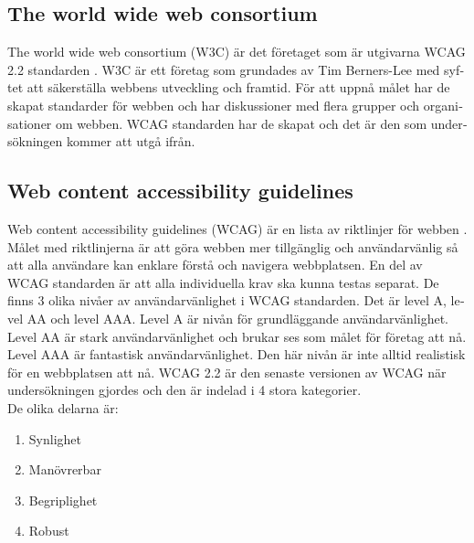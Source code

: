 \documentclass[11p]{article}
\begin{document}
\begin{otherlanguage}{swedish}
    \subsection{The world wide web consortium}
    The world wide web consortium (W3C) är det företaget som är utgivarna WCAG 2.2 standarden \parencite{W3C}.
    W3C är ett företag som grundades av Tim Berners-Lee med syftet att säkerställa webbens utveckling och framtid.
    För att uppnå målet har de skapat standarder för webben och har diskussioner med flera grupper och organisationer om webben.
    WCAG standarden har de skapat och det är den som undersökningen kommer att utgå ifrån.

    \subsection{Web content accessibility guidelines} %
    Web content accessibility guidelines (WCAG) är en lista av riktlinjer för webben \parencite{WCAG_2.2}.
    Målet med riktlinjerna är att göra webben mer tillgänglig och användarvänlig så att alla användare kan enklare förstå och navigera webbplatsen.
    En del av WCAG standarden är att alla individuella krav ska kunna testas separat.
    De finns 3 olika nivåer av användarvänlighet i WCAG standarden.
    Det är level A, level AA och level AAA.
    Level A är nivån för grundläggande användarvänlighet.
    Level AA är stark användarvänlighet och brukar ses som målet för företag att nå. %
    Level AAA är fantastisk användarvänlighet.
    Den här nivån är inte alltid realistisk för en webbplatsen att nå. %
    WCAG 2.2 är den senaste versionen av WCAG när undersökningen gjordes och den är indelad i 4 stora kategorier.
    \\De olika delarna är:
    \begin{enumerate}
        \item Synlighet %
        \item Manövrerbar
        \item Begriplighet
        \item Robust
    \end{enumerate}


\end{otherlanguage}
\end{document}
